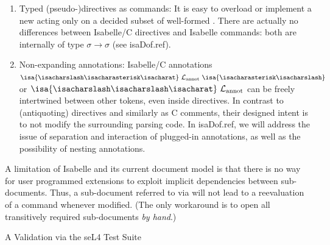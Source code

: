 \begin{isabellebody}
\begin{isamarkuptext}
\begin{enumerate}
\item Typed (pseudo-)directives as commands: It is easy to overload or implement a new
 acting only on a decided subset of well-formed . There
are actually no differences between Isabelle/C directives and Isabelle commands: both are
internally of type $\sigma \rightarrow \sigma$ (see \csname isaDof.ref).

\item Non-expanding annotations: Isabelle/C annotations
$\isa{{\isacharslash}{\isacharasterisk}{\isacharat}}~\mathcal{L}_\text{annot}~\isa{{\isacharasterisk}{\isacharslash}}$ or
$\isa{{\isacharslash}{\isacharslash}{\isacharat}}~\mathcal{L}_\text{annot}$ can be freely intertwined between other tokens, even
inside directives. In contrast to (antiquoting) directives and similarly as C comments, their
designed intent is to not modify the surrounding parsing code. In \csname isaDof.ref, we will address the issue of separation and interaction of
plugged-in annotations, as well as the possibility of nesting annotations.%
\end{enumerate}%
\end{isamarkuptext}\isamarkuptrue%
%
\begin{isamarkuptext}%
A limitation of Isabelle and its current document model is that there is no way for user
programmed extensions to exploit implicit dependencies between
sub-documents. Thus, a sub-document referred to via  will not
lead to a reevaluation of a  command whenever modified. (The only 
workaround is to open all transitively required sub-documents  \emph{by hand}.)%
\end{isamarkuptext}\isamarkuptrue%
%
\begin{isamarkupsubsection*}%
[label = {parser_validation},type = {scholarly_paper.technical}, args={label = {parser_validation},type = {scholarly_paper.technical}, Isa_COL.text_element.level = {}, Isa_COL.text_element.referentiable = {False}, Isa_COL.text_element.variants = {{STR ''outline'', STR ''document''}}, scholarly_paper.text_section.main_author = {}, scholarly_paper.text_section.fixme_list = {}, Isa_COL.text_element.level = {}, scholarly_paper.technical.definition_list = {}}]A Validation via the seL4 Test Suite%
\end{isamarkupsubsection*}\isamarkuptrue%

\end{isabellebody}
